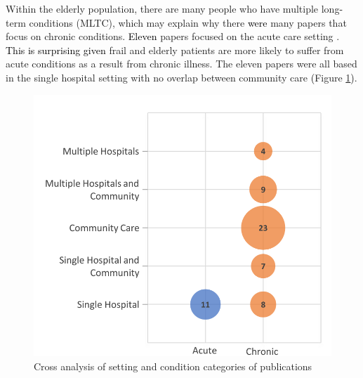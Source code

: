 \documentclass[../thesis.tex]{subfiles}
\begin{document}
Within the elderly population, there are many people who have multiple long\textcolor{black}{-}term conditions (MLTC), which may explain why there \textcolor{black}{were} many papers that focus on chronic conditions. \textcolor{black}{Eleven} papers focused on the acute care setting \cite{Abe, Azad, Franklin, Kul, Onggo, Rashwan, Rossille, Shaw, Silvester, Trevisan, Wallace}. %
\textcolor{black}{This is surprising given }%
frail and elderly patients are more likely to suffer from acute conditions as a result from chronic illness.
The eleven papers were all based in the single hospital setting with no overlap between community care \textcolor{black}{(}Figure \ref{fig:HospCondition}\textcolor{black}{)}.

\begin{figure}[H]
\centering
  \includegraphics[scale =0.6]{Chapter2/Figures/HospitalCondition1.pdf}
\caption{Cross analysis of setting and condition categories of publications}
\label{fig:HospCondition}  
\end{figure} 
\end{document}
